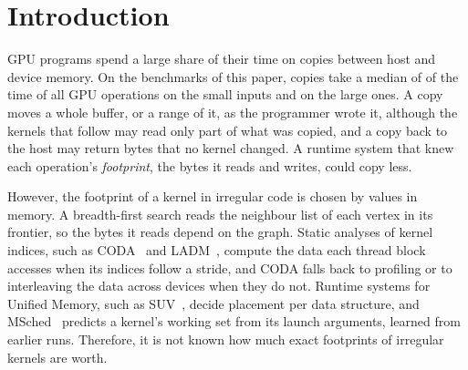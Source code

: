 \documentclass[11pt]{article}
\newcommand{\term}[1]{\emph{#1}}
\begin{document}
\begin{abstract}
measure on the A30. A prefetch call costs \numUvmPrefetchCallUs{}~\textmu s, so prefetching every page a wave
touches is slower than demand paging (\numUvmWLargeFourHy{}$\times$ on the large inputs). Prefetching only runs of
contiguous pages long enough to repay the call, and evicting the page used farthest ahead, speeds the
\numUvmWLargeFourOver{} large programs that can run in less memory up by a geometric mean of
\numUvmWLargeFourHyMin{}$\times$ over demand paging, with the interpreter's footprints exactly as with the traced
ones. On the A30 itself, the interpreter's plans for prefetching before each kernel are identical to the traced
ones, and prefetching runs speeds unmodified programs up by \numHwHalfHyMinAll{}$\times$ to
\numHwHalfTrMinAll{}$\times$ at half of their memory, across repeated measurements of the same plans. However, these
plans do not need exact footprints. Except in the breadth-first searches, the pages a kernel touches in each buffer
form one contiguous range, so prefetching the pages between the first and the last that a wave touches in each
buffer, which a bounds analysis of the indices or one recorded run could give, gains as much as the footprints in
every configuration of the model, and its plans are identical to the traced plans on the A30 in
\numHwRangeSame{} of \numHwPlanConfigs{} combinations of program and share of memory.
\end{abstract}

\section{Introduction}
\label{sec:intro}

GPU programs spend a large share of their time on copies between host and device memory. On the benchmarks of this
paper, copies take a median of \numSmallCopyShareMed{} of the time of all GPU operations on the small inputs and
\numLargeCopyShareMed{} on the large ones. A copy moves a whole buffer, or a range of it, as the programmer wrote it,
although the kernels that follow may read only part of what was copied, and a copy back to the host may return
bytes that no kernel changed. A runtime system that knew each operation's \term{footprint}, the bytes it reads and
writes, could copy less.

However, the footprint of a kernel in irregular code is chosen by values in memory. A breadth-first search reads the
neighbour list of each vertex in its frontier, so the bytes it reads depend on the graph. Static analyses of kernel
indices, such as CODA~\cite{Kim2018CODA} and LADM~\cite{Khairy2020LADM}, compute the data each thread block
accesses when its indices follow a stride, and CODA falls back to profiling or to interleaving the data across
devices when they do not. Runtime systems for Unified Memory, such as SUV~\cite{B2024SUV}, decide placement per data structure,
and MSched~\cite{Shen2025MSched} predicts a kernel's working set from its launch arguments, learned from earlier
runs. Therefore, it is not known how much exact footprints of irregular kernels are worth.
\end{document}
